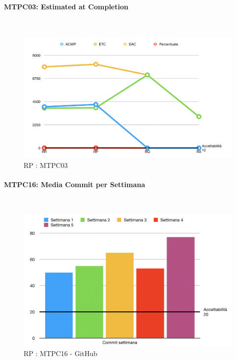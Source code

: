 \pagebreak

\paragraph{MTPC03: Estimated at Completion}\-\\
\begin{figure}[H]
	\begin{center}
		\includegraphics[scale=0.5]{./images/grafici_RP/MTPC03.png} 
	\end{center}
	\caption{RP : MTPC03}
\end{figure}

\paragraph{MTPC16: Media Commit per Settimana}\-\\
\begin{figure}[H]
	\begin{center}
		\includegraphics[scale=0.5]{./images/grafici_RP/commitGithub.png} 
	\end{center}
	\caption{RP : MTPC16 - GitHub}
\end{figure}

